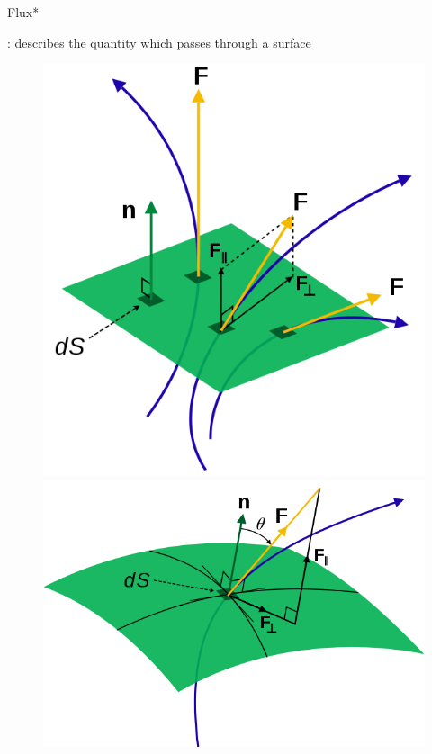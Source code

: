 \documentclass[9pt,mathserif]{beamer}
\let\emph\relax %
\begin{document}
\begin{frame}{Flux*}
	\begin{outline}
		\1 \emph{Flux}: describes the quantity which passes through
		a surface
	\end{outline}
	\begin{figure}
		\centering
		\includegraphics[height=0.6\textheight]{img/idealfluid/General_flux_diagram1.png}
		\includegraphics[height=0.4\textheight]{img/idealfluid/General_flux_diagram2.png}
	\end{figure}
\end{frame}
\end{document}
